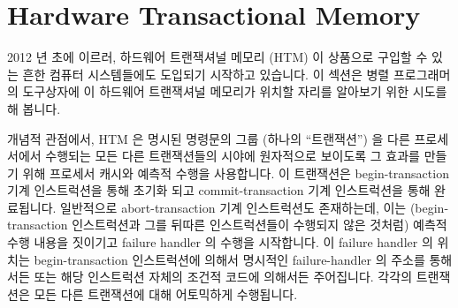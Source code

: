 
\section{Hardware Transactional Memory}
\label{sec:future:Hardware Transactional Memory}

2012 년 초에 이르러, 하드웨어 트랜잭셔널 메모리 (HTM) 이 상품으로 구입할 수
있는 흔한 컴퓨터 시스템들에도 도입되기 시작하고 있습니다.
이 섹션은 병렬 프로그래머의 도구상자에 이 하드웨어 트랜잭셔널 메모리가 위치할
자리를 알아보기 위한 시도를 해 봅니다.

개념적 관점에서, HTM 은 명시된 명령문의 그룹 (하나의 ``트랜잭션'') 을 다른
프로세서에서 수행되는 모든 다른 트랜잭션들의 시야에 원자적으로 보이도록 그
효과를 만들기 위해 프로세서 캐시와 예측적 수행을 사용합니다.
이 트랜잭션은 begin-transaction 기계 인스트럭션을 통해 초기화 되고
commit-transaction 기계 인스트럭션을 통해 완료됩니다.
일반적으로 abort-transaction 기계 인스트럭션도 존재하는데, 이는
(begin-transaction 인스트럭션과 그를 뒤따른 인스트럭션들이 수행되지 않은
것처럼) 예측적 수행 내용을 짓이기고 failure handler 의 수행을 시작합니다.
이 failure handler 의 위치는 begin-transaction 인스트럭션에 의해서 명시적인
failure-handler 의 주소를 통해서든 또는 해당 인스트럭션 자체의 조건적 코드에
의해서든 주어집니다.
각각의 트랜잭션은 모든 다른 트랜잭션에 대해 어토믹하게 수행됩니다.
\iffalse

As of early 2012, hardware transactional memory (HTM) is starting to emerge
into commercially available commodity computer systems.
This section makes a first attempt to find its place in the parallel
programmer's toolbox.

From a conceptual viewpoint, HTM uses processor caches and speculative
execution to make a designated group of statements (a ``transaction'')
take effect atomically
from the viewpoint of any other transactions running on other processors.
This transaction is initiated by a
begin-transaction machine instruction and completed by a commit-transaction
machine instruction.
There is typically also an abort-transaction machine instruction, which
squashes the speculation (as if the begin-transaction instruction and
all following instructions had not executed) and commences execution
at a failure handler.
The location of the failure handler is typically specified by the
begin-transaction instruction, either as an explicit failure-handler
address or via a condition code set by the instruction itself.
Each transaction executes atomically with respect to all other transactions.
\fi

